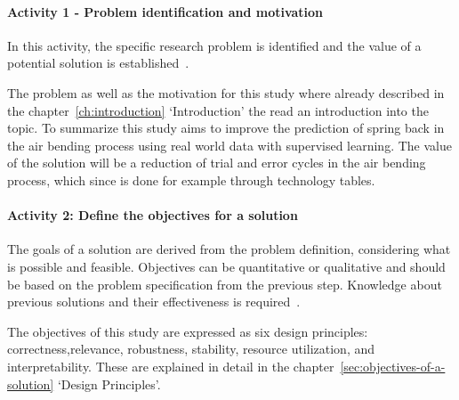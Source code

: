 

\paragraph{Activity 1 - Problem identification and motivation}

In this activity, the specific research problem is identified and the value of a potential solution is
established~\cite[p. 54--55]{peffers_designscienceresearch_2007}.

The problem as well as the motivation for this study where already described in the chapter~\ref{ch:introduction}
`Introduction' the read an introduction into the topic.
To summarize this study aims to improve the prediction of spring back in the air bending process using real world
data with supervised learning.
The value of the solution will be a reduction of trial and error cycles in the air bending process, which since is done
for example through technology tables.

\paragraph{Activity 2: Define the objectives for a solution}
The goals of a solution are derived from the problem definition, considering what is possible and feasible.
Objectives can be quantitative or qualitative and should be based on the problem specification from the previous
step.
Knowledge about previous solutions and their effectiveness is required~\cite[p. 55]{peffers_designscienceresearch_2007}.

The objectives of this study are expressed as six design principles:
correctness,relevance, robustness, stability, resource utilization, and interpretability.
These are explained in detail in the chapter~\ref{sec:objectives-of-a-solution} `Design Principles'.

